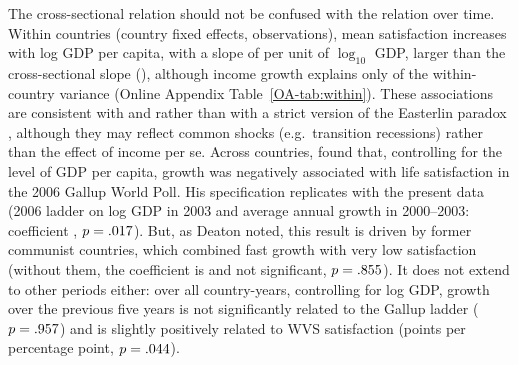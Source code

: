 \documentclass[12pt]{article}
\begin{document}
The cross-sectional relation should not be confused with the relation over time. Within countries (country fixed effects, \nWithin observations), mean satisfaction increases with log GDP per capita, with a slope of \withinSlopeSatisfiedMean per unit of $\log_{10}$ GDP, larger than the cross-sectional slope (\crossSlopeSatisfiedMean), although income growth explains only \withinRtwoSatisfiedMean of the within-country variance (Online Appendix Table~\ref{OA-tab:within}). These associations are consistent with \citet{stevenson_economic_2008} and \citet{sacks_new_2012} rather than with a strict version of the Easterlin paradox \citep{easterlin_does_1974,easterlin_happiness_2010}, although they may reflect common shocks (e.g.\ transition recessions) rather than the effect of income per se. Across countries, \citet{deaton_income_2008} found that, controlling for the level of GDP per capita, growth was negatively associated with life satisfaction in the 2006 Gallup World Poll. His specification replicates with the present data (2006 ladder on log GDP in 2003 and average annual growth in 2000--2003: coefficient \deatonGrowth, $p = .017$). But, as Deaton noted, this result is driven by former communist countries, which combined fast growth with very low satisfaction (without them, the coefficient is \deatonGrowthNoExCommunist and not significant, $p = .855$). It does not extend to other periods either: over all country-years, controlling for log GDP, growth over the previous five years is not significantly related to the Gallup ladder ($p = .957$) and is slightly positively related to WVS satisfaction (\growthCoefWVS points per percentage point, $p = .044$).
\end{document}
